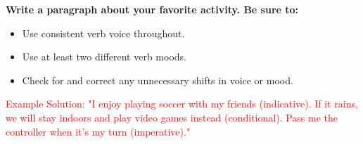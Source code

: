 \documentclass[12pt]{article}
\begin{document}
\vspace{1em}

\begin{tcolorbox}[colframe=black!60, colback=white, 
coltitle=black, colbacktitle=black!15, fonttitle=\bfseries\Large, 
title=Exit Ticket, halign title=center, left=10pt, right=10pt, top=10pt, bottom=15pt]
\textbf{Write a paragraph about your favorite activity. Be sure to:}
\begin{itemize}
    \item Use consistent verb voice throughout.  
    \item Use at least two different verb moods.  
    \item Check for and correct any unnecessary shifts in voice or mood.  
\end{itemize}

\textcolor{red}{Example Solution: "I enjoy playing soccer with my friends (indicative). If it rains, we will stay indoors and play video games instead (conditional). Pass me the controller when it’s my turn (imperative)."}
\end{tcolorbox}
\end{document}
